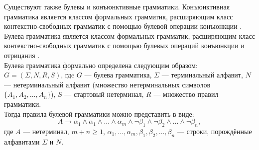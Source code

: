 Существуют также булевы и конъюнктивные грамматики.  Конъюнктивная грамматика является классом формальных грамматик, расширяющим класс контекстно-свободных грамматик с помощью булевой операции конъюнкции \cite{conjunctive}. Булева грамматика является классом формальных грамматик, расширяющим класс контекстно-свободных грамматик с помощью булевых операций конъюнкции и отрицания \cite{boolean}.
\\Булева грамматика формально определена следующим образом:
\\$G = (\Sigma, N, R, S)$, гдe $G$ --- булева грамматика, $\Sigma$ --- терминальный алфавит, $N$ --- нетерминальный алфавит (множество
нетерминальных символов $\{A_1, A_2, … , A_n\}$), $S$ --- стартовый
нетерминал, $R$ --- множество правил грамматики.
\\Тогда правила булевой грамматики можно представить в виде:
\begin{equation}
A \rightarrow \alpha_1 \wedge  \alpha_1 \wedge … \wedge  \alpha_m \wedge \neg \beta_1 \wedge \neg \beta_2 \wedge … \wedge \neg \beta_n,
\end{equation}
где $A$ --- нетерминал, $m + n \ge 1$, $\alpha_1, ..., \alpha_m , \beta_1,\beta_2, … , \beta_n$ --- строки, порождённые алфавитами $\Sigma$ и $N$.

